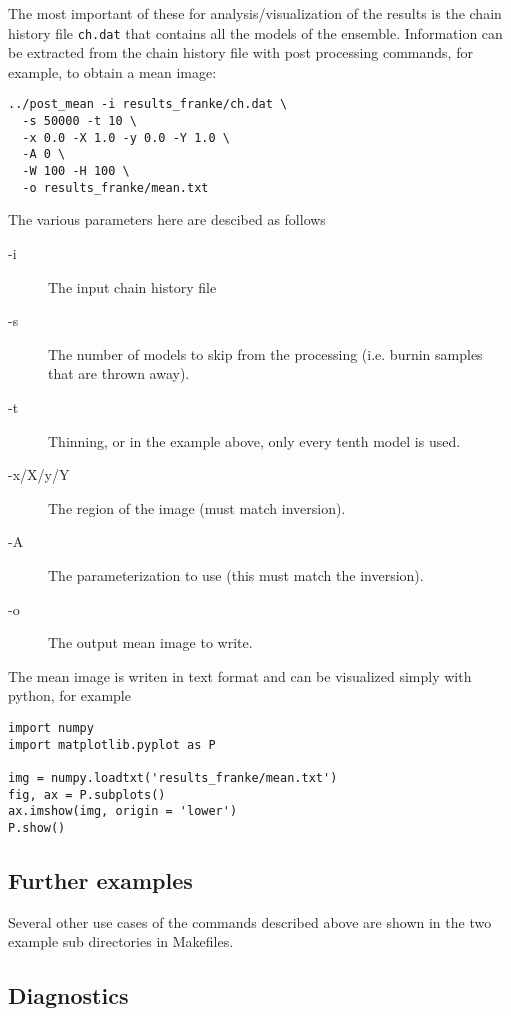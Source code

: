 \documentclass[a4paper,12pt]{article}
\begin{document}
The most important of these for analysis/visualization of the results is the chain
history file {\tt ch.dat} that contains all the models of the ensemble.
Information can be extracted from the chain history file with post processing
commands, for example, to obtain a mean image:

\begin{verbatim}
../post_mean -i results_franke/ch.dat \
  -s 50000 -t 10 \
  -x 0.0 -X 1.0 -y 0.0 -Y 1.0 \
  -A 0 \
  -W 100 -H 100 \
  -o results_franke/mean.txt
\end{verbatim}

The various parameters here are descibed as follows

\begin{description}
\item[-i] The input chain history file
\item[-s] The number of models to skip from the processing (i.e. burnin samples that
  are thrown away).
\item[-t] Thinning, or in the example above, only every tenth model is used.
\item[-x/X/y/Y] The region of the image (must match inversion).
\item[-A] The parameterization to use (this must match the inversion).
\item[-o] The output mean image to write.
\end{description}

The mean image is writen in text format and can be visualized simply
with python, for example

\begin{verbatim}
import numpy
import matplotlib.pyplot as P

img = numpy.loadtxt('results_franke/mean.txt')
fig, ax = P.subplots()
ax.imshow(img, origin = 'lower')
P.show()
\end{verbatim}

\subsection{Further examples}

Several other use cases of the commands described above are shown in the
two example sub directories in Makefiles.
  
\subsection{Diagnostics}
\end{document}
